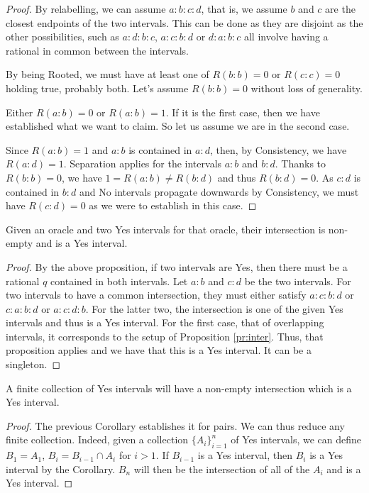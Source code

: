 \documentclass[12pt]{article}
\begin{document}
\begin{proof}
By relabelling, we can assume $a:b:c:d$, that is, we assume $b$ and $c$ are the closest endpoints of the two intervals. This can be done as they are disjoint as the other possibilities, such as $a:d:b:c$, $a:c:b:d$ or $d:a:b:c$ all involve having a rational in common between the intervals.  

By being Rooted, we must have at least one of $R(b:b) = 0$ or $R(c:c) = 0$ holding true, probably both. Let's assume $R(b:b) = 0$ without loss of generality.
 
Either $R(a:b) = 0$ or $R(a:b)=1$. If it is the first case, then we have established what we want to claim. So let us assume we are in the second case. 

Since $R(a:b) = 1$ and $a:b$ is contained in $a:d$, then, by Consistency, we have $R(a:d) = 1$. Separation applies for the intervals $a:b$ and $b:d$. Thanks to $R(b:b) = 0$, we have $1 = R(a:b) \neq R(b:d)$ and thus $R(b:d) = 0$. As $c:d$ is contained in $b:d$ and No intervals propagate downwards by Consistency, we must have $R(c:d)=0$  as we were to establish in this case. 
\end{proof}

\begin{corollary}\label{cor:pair-inter}
    Given an oracle and two Yes intervals for that oracle, their intersection is non-empty and is a Yes interval. 
\end{corollary}

\begin{proof}
    By the above proposition, if two intervals are Yes, then there must be a rational $q$ contained in both intervals. Let $a:b$ and $c:d$ be the two intervals. For two intervals to have a common intersection, they must either satisfy $a:c:b:d$ or $c:a:b:d$ or $a:c:d:b$. For the latter two, the intersection is one of the given Yes intervals and thus is a Yes interval. For the first case, that of overlapping intervals, it corresponds to the setup of Proposition \ref{pr:inter}. Thus, that proposition applies and we have that this is a Yes interval. It can be a singleton. 
\end{proof}

\begin{corollary}\label{cor:finite-inter}
    A finite collection of Yes intervals will have a non-empty intersection which is a Yes interval. 
\end{corollary}

\begin{proof}
The previous Corollary establishes it for pairs. We can thus reduce any finite collection. Indeed, given a collection $\{A_i\}_{i=1}^n$ of Yes intervals, we can define $B_1 = A_1$, $B_i = B_{i-1} \cap A_i$ for $i > 1$. If $B_{i-1}$ is a Yes interval, then $B_i$ is a Yes interval by the Corollary. $B_n$ will then be the intersection of all of the $A_i$ and is a Yes interval.  
\end{proof}
\end{document}
